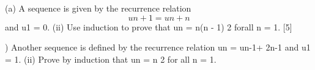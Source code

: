 (a) A sequence is given by the recurrence relation
\[un+1 = un + n \]and u1 = 0.
(ii) Use induction to prove that
un =
n(n - 1)
2
forall n = 1.
[5]

) Another sequence is defined by the recurrence relation un = un-1+ 2n-1 and
u1 = 1.
(ii) Prove by induction that un = n
2
for all n = 1.
 